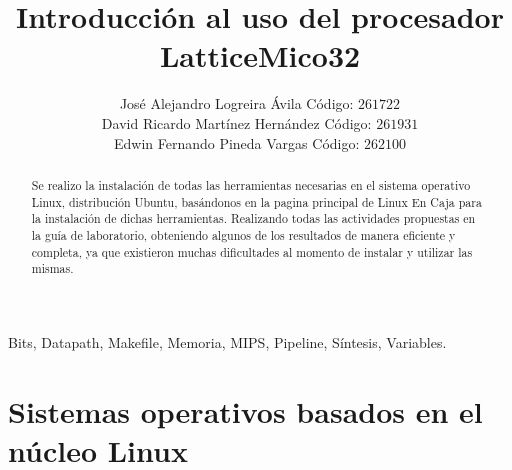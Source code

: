 \documentclass[twocolumn]{IEEEtran}
\begin{document}
\title{Introducción al uso del procesador LatticeMico32}
\author{José Alejandro Logreira Ávila Código: $261722$\\
	David Ricardo Martínez Hernández Código: $261931$\\
	Edwin Fernando Pineda Vargas Código: $262100$}
\maketitle
{}
\begin{keywords}
 Bits, Datapath, Makefile, Memoria, MIPS, Pipeline, Síntesis, Variables.
\end{keywords}

\begin{abstract}
 Se realizo la instalación de todas las herramientas necesarias en el sistema operativo Linux, distribución Ubuntu, basándonos en la pagina principal de Linux En Caja para la instalación de dichas herramientas. Realizando todas las actividades propuestas en la guía de laboratorio, obteniendo algunos de los resultados de manera eficiente y completa, ya que existieron muchas dificultades al momento de instalar y utilizar las mismas.
\end{abstract}

\section{Sistemas operativos basados en el núcleo Linux}
\end{document}
